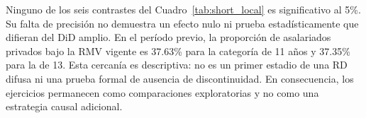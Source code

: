 

Ninguno de los seis contrastes del Cuadro~\ref{tab:short_local} es significativo al 5\%. Su falta de precisión no demuestra un efecto nulo ni prueba estadísticamente que difieran del DiD amplio. En el período previo, la proporción de asalariados privados bajo la RMV vigente es 37.63\% para la categoría de 11 años y 37.35\% para la de 13. Esta cercanía es descriptiva: no es un primer estadio de una RD difusa ni una prueba formal de ausencia de discontinuidad. En consecuencia, los ejercicios permanecen como comparaciones exploratorias y no como una estrategia causal adicional.
\FloatBarrier
